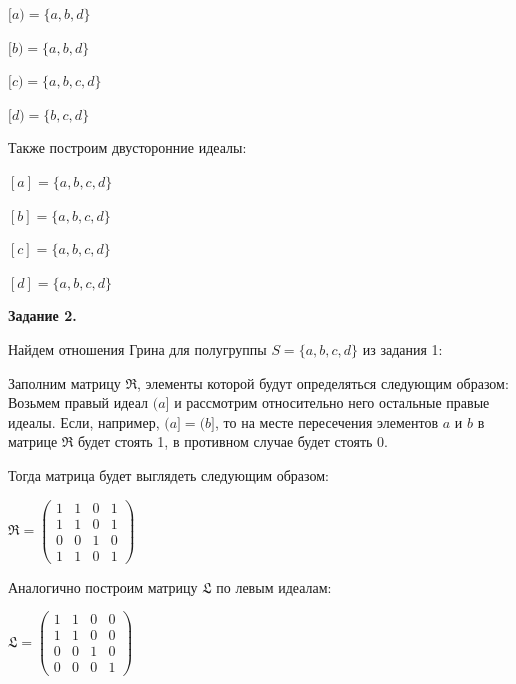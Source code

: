 \documentclass[bachelor, och, labwork]{shiza}
\begin{document}
\begin{enumerate}
      \begin{center}
      
        $[a) = \{a, b, d\}$

        $[b) = \{a, b, d\}$

        $[c) = \{a, b, c, d\}$

        $[d) = \{b, c, d\}$
      \end{center}

      Также построим двусторонние идеалы:

      \begin{center}
      
        $[a] = \{a, b, c, d\}$

        $[b] = \{a, b, c, d\}$

        $[c] = \{a, b, c, d\}$

        $[d] = \{a, b, c, d\}$
        
      \end{center}


    \end{enumerate}
    
    
    \textbf{Задание 2.}
    
    Найдем отношения Грина для полугруппы $S = \{a, b, c, d\}$ из задания 1:

    Заполним матрицу $\mathfrak{R}$, элементы которой будут определяться следующим образом: Возьмем правый идеал $(a]$ и рассмотрим относительно
    него остальные правые идеалы. Если, например, $(a] = (b]$, то на месте пересечения элементов $a$ и $b$ в матрице $\mathfrak{R}$ будет стоять 1,
    в противном случае будет стоять 0.

    Тогда матрица будет выглядеть следующим образом:

    \begin{center}
      $\mathfrak{R} =
      \begin{pmatrix}
        1 & 1 & 0 & 1 \\
        1 & 1 & 0 & 1 \\
        0 & 0 & 1 & 0 \\
        1 & 1 & 0 & 1
      \end{pmatrix}$
    \end{center}
    
    Аналогично построим матрицу $\mathfrak{L}$ по левым идеалам:

    \begin{center}
      $\mathfrak{L} =
      \begin{pmatrix}
        1 & 1 & 0 & 0 \\
        1 & 1 & 0 & 0 \\
        0 & 0 & 1 & 0 \\
        0 & 0 & 0 & 1
      \end{pmatrix}$
    \end{center}
    
\end{document}
